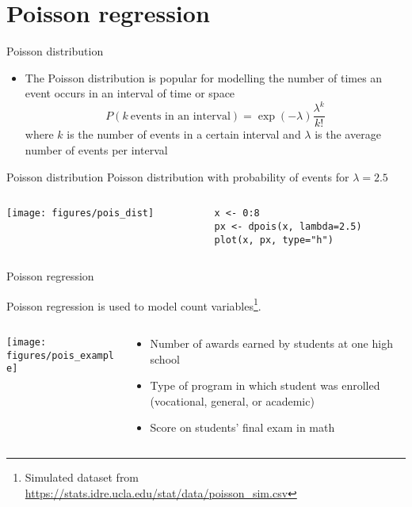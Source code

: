 \documentclass{beamer}
\begin{document}
\section{Poisson regression}

\begin{frame}{Poisson distribution}
\begin{itemize}
  \item The Poisson distribution is popular for modelling the number of
    times an event occurs in an interval of time or space
\[
  P(k~\text{events in an interval}) = \exp(-\lambda)\frac{\lambda^k}{k!}
\]
where $k$ is the number of events in a certain interval and $\lambda$ is
the average number of events per interval
\end{itemize}
\end{frame}

\begin{frame}[fragile]{Poisson distribution}
  Poisson distribution with probability of events for $\lambda = 2.5$\\[2ex]

\begin{columns}[c]
\begin{column}{6cm}
  \texttt{[image: figures/pois\_dist]}
\end{column}
\begin{column}{5cm}
  \begin{lstlisting}[style=plain]
x <- 0:8
px <- dpois(x, lambda=2.5)
plot(x, px, type="h")
\end{lstlisting}
\end{column}
\end{columns}
\end{frame}

\begin{frame}{Poisson regression}
  
Poisson regression is used to model count variables\footnote{Simulated dataset from
  \url{https://stats.idre.ucla.edu/stat/data/poisson_sim.csv}}.\\[2ex]
\begin{columns}[c]
\begin{column}{6cm}
  \texttt{[image: figures/pois\_example]}
\end{column}
\begin{column}{5cm}
  \begin{itemize}
    \item Number of awards earned by students at one high school
    \item Type of program in which student was enrolled (vocational,
    general, or academic)
    \item Score on students' final exam in math
  \end{itemize}
\end{column}
\end{columns}
\end{frame}
\end{document}
